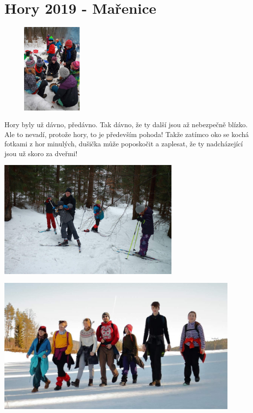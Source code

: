 \chapter{Hory 2019 - Mařenice} %
\label{cha:hory}
\begin{figure}
	\centering
	\includegraphics[width=3cm]{img/hory/jidlo.jpg}
\end{figure}
Hory byly už dávno, předávno. Tak dávno, že ty další jsou až nebezpečně blízko. Ale to nevadí, protože hory, to je především pohoda! Takže zatímco oko se kochá fotkami z hor minulých, dušička může poposkočit a zaplesat, že ty nadcházející jsou už skoro za dveřmi!


\begin{center}

\includegraphics[width=9cm]{img/hory/lyze.jpg}
\end{center}

\vspace{5mm}

\begin{center}
\includegraphics[width=12cm]{img/hory/drsnaci.jpg}
\end{center}



\clearpage